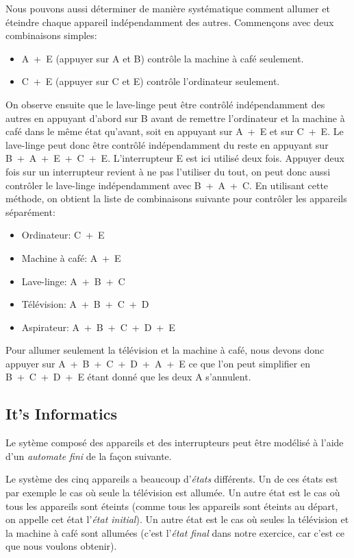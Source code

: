 \documentclass[a4paper,11pt]{report}
\begin{document}
Nous pouvons aussi déterminer de manière systématique comment allumer et éteindre chaque appareil indépendamment des autres. Commençons avec deux combinaisons simples:

\begin{itemize}
  \item A~+~E (appuyer sur A et B) contrôle la machine à café seulement.
  \item C~+~E (appuyer sur C et E) contrôle l’ordinateur seulement.
\end{itemize}

On observe ensuite que le lave-linge peut être contrôlé indépendamment des autres en appuyant d’abord sur B avant de remettre l’ordinateur et la machine à café dans le même état qu’avant, soit en appuyant sur A~+~E et sur C~+~E. Le lave-linge peut donc être contrôlé indépendamment du reste en appuyant sur B~+~A~+~E~+~C~+~E. L’interrupteur E est ici utilisé deux fois. Appuyer deux fois sur un interrupteur revient à ne pas l’utiliser du tout, on peut donc aussi contrôler le lave-linge indépendamment avec B~+~A~+~C. En utilisant cette méthode, on obtient la liste de combinaisons suivante pour contrôler les appareils séparément:

\begin{itemize}
  \item Ordinateur: C~+~E
  \item Machine à café: A~+~E
  \item Lave-linge: A~+~B~+~C
  \item Télévision: A~+~B~+~C~+~D
  \item Aspirateur: A~+~B~+~C~+~D~+~E
\end{itemize}

Pour allumer seulement la télévision et la machine à café, nous devons donc appuyer sur A~+~B~+~C~+~D~+~A~+~E ce que l’on peut simplifier en B~+~C~+~D~+~E étant donné que les deux A s’annulent.


\subsection*{It’s Informatics}

Le sytème composé des appareils et des interrupteurs peut être modélisé à l’aide d’un \emph{automate fini} de la façon suivante.

Le système des cinq appareils a beaucoup d’\emph{états} différents. Un de ces états est par exemple le cas où seule la télévision est allumée. Un autre état est le cas où tous les appareils sont éteints (comme tous les appareils sont éteints au départ, on appelle cet état l’\emph{état initial}). Un autre état est le cas où seules la télévision et la machine à café sont allumées (c’est l’\emph{état final} dans notre exercice, car c’est ce que nous voulons obtenir).
\end{document}
